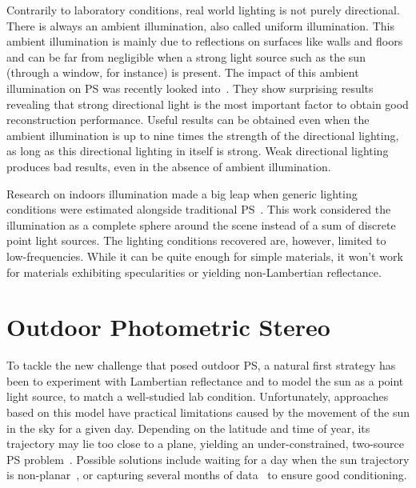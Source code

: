 \documentclass{report}
\begin{document}
Contrarily to laboratory conditions, real world lighting is not purely directional. There is always an ambient illumination, also called uniform illumination. This ambient illumination is mainly due to reflections on surfaces like walls and floors and can be far from negligible when a strong light source such as the sun (through a window, for instance) is present. The impact of this ambient illumination on PS was recently looked into~\cite{Angelopoulou2013}. They show surprising results revealing that strong directional light is the most important factor to obtain good reconstruction performance. Useful results can be obtained even when the ambient illumination is up to nine times the strength of the directional lighting, as long as this directional lighting in itself is strong. Weak directional lighting produces bad results, even in the absence of ambient illumination.

Research on indoors illumination made a big leap when generic lighting conditions were estimated alongside traditional PS~\cite{basri-ijcv-2007}. This work considered the illumination as a complete sphere around the scene instead of a sum of discrete point light sources. The lighting conditions recovered are, however, limited to low-frequencies. While it can be quite enough for simple materials, it won't work for materials exhibiting specularities or yielding non-Lambertian reflectance.



\section{Outdoor Photometric Stereo}

To tackle the new challenge that posed outdoor PS, a natural first strategy has been to experiment with Lambertian reflectance and to model the sun as a point light source, to match a well-studied lab condition. Unfortunately, approaches based on this model have practical limitations caused by the movement of the sun in the sky for a given day. Depending on the latitude and time of year, its trajectory may lie too close to a plane, yielding an under-constrained, two-source PS problem~\cite{hernandez-pami-11}. Possible solutions include waiting for a day when the sun trajectory is non-planar~\cite{shen-pg-14}, or capturing several months of data~\cite{ackermann-cvpr-12,abrams-eccv-12} to ensure good conditioning.
\end{document}
